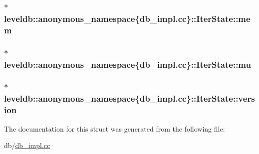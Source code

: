 \subsubsection[{mem}]{$\ast$ leveldb\+::anonymous\+\_\+namespace\{db\+\_\+impl.\+cc\}\+::Iter\+State\+::mem}\label{structleveldb_1_1anonymous__namespace_02db__impl_8cc_03_1_1_iter_state_aa6a99476de94976aa80eb4b0d82cd0f5}
\hypertarget{structleveldb_1_1anonymous__namespace_02db__impl_8cc_03_1_1_iter_state_a8f6fc009b08eabb816a85bfaa510c90d}{}
\subsubsection[{mu}]{$\ast$ leveldb\+::anonymous\+\_\+namespace\{db\+\_\+impl.\+cc\}\+::Iter\+State\+::mu}\label{structleveldb_1_1anonymous__namespace_02db__impl_8cc_03_1_1_iter_state_a8f6fc009b08eabb816a85bfaa510c90d}
\hypertarget{structleveldb_1_1anonymous__namespace_02db__impl_8cc_03_1_1_iter_state_a5a171845ecad140877b86930306c84b6}{}
\subsubsection[{version}]{$\ast$ leveldb\+::anonymous\+\_\+namespace\{db\+\_\+impl.\+cc\}\+::Iter\+State\+::version}\label{structleveldb_1_1anonymous__namespace_02db__impl_8cc_03_1_1_iter_state_a5a171845ecad140877b86930306c84b6}


The documentation for this struct was generated from the following file\+:\begin{DoxyCompactItemize}
\item 
db/\hyperlink{db__impl_8cc}{db\+\_\+impl.\+cc}\end{DoxyCompactItemize}
